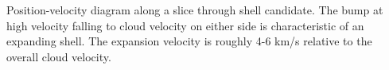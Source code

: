 \label{fig:pv} Position-velocity diagram along a slice through shell candidate. The bump at high velocity falling to cloud velocity on either side is characteristic of an expanding shell. The expansion velocity is roughly 4-6 km/s relative to the overall cloud velocity.